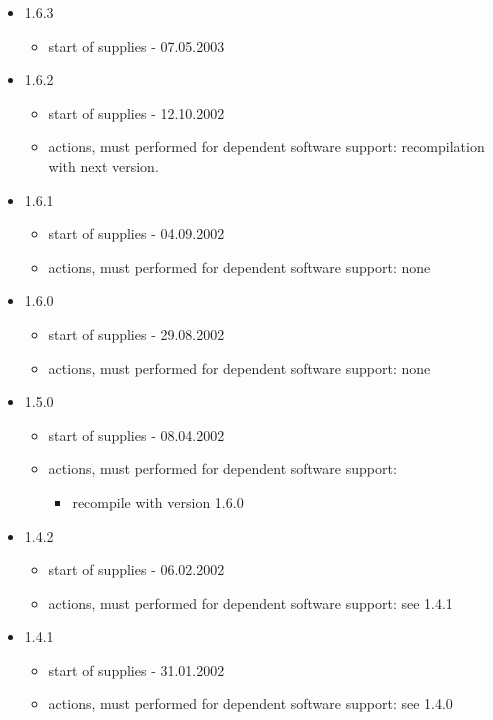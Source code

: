 \documentclass[10pt]{article}
\begin{document}
 \begin{itemize}
  \item 1.6.3
  \begin{itemize}
   \item start of supplies - 07.05.2003
  \end{itemize}
  \item 1.6.2
  \begin{itemize}
   \item start of supplies - 12.10.2002
   \item actions, must performed for dependent software support: recompilation
  with next version.
  \end{itemize}
  \item 1.6.1
  \begin{itemize}
   \item start of supplies - 04.09.2002
   \item actions, must performed for dependent software support: none
  \end{itemize}
  \item 1.6.0
  \begin{itemize}
   \item start of supplies - 29.08.2002
   \item actions, must performed for dependent software support: none
  \end{itemize}
  \item 1.5.0
  \begin{itemize}
   \item start of supplies - 08.04.2002
   \item actions, must performed for dependent software support: 
   \begin{itemize}
     \item recompile with version 1.6.0
   \end{itemize}
  \end{itemize}
  \item 1.4.2
  \begin{itemize}
   \item start of supplies - 06.02.2002
   \item actions, must performed for dependent software support: see 1.4.1
  \end{itemize}
  \item 1.4.1
  \begin{itemize}
   \item start of supplies - 31.01.2002
   \item actions, must performed for dependent software support: see 1.4.0

\end{itemize}
\end{itemize}
\end{document}

